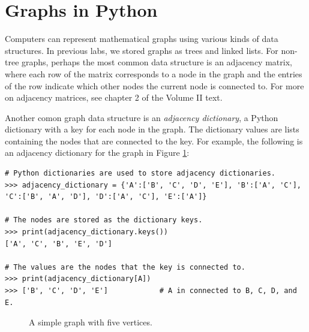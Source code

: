 \label{lab:SixDegreesKevinBacon}


\section*{Graphs in Python}

Computers can represent mathematical graphs using various kinds of data structures.
In previous labs, we stored graphs as trees and linked lists.
For non-tree graphs, perhaps the most common data structure is an adjacency matrix, where each row of the matrix corresponds to a node in the graph and the entries of the row indicate which other nodes the current node is connected to.
For more on adjacency matrices, see chapter 2 of the Volume II text.

Another comon graph data structure is an \emph{adjacency dictionary}, a Python dictionary with a key for each node in the graph.
The dictionary values are lists containing the nodes that are connected to the key.
For example, the following is an adjacency dictionary for the graph in Figure \ref{fig:simple_graph}:

\begin{lstlisting}
# Python dictionaries are used to store adjacency dictionaries.
>>> adjacency_dictionary = {'A':['B', 'C', 'D', 'E'], 'B':['A', 'C'],
'C':['B', 'A', 'D'], 'D':['A', 'C'], 'E':['A']}

# The nodes are stored as the dictionary keys.
>>> print(adjacency_dictionary.keys())
['A', 'C', 'B', 'E', 'D']

# The values are the nodes that the key is connected to.
>>> print(adjacency_dictionary[A])
>>> ['B', 'C', 'D', 'E']            # A in connected to B, C, D, and E.
\end{lstlisting}

\begin{figure}
\centering
{}
\caption{A simple graph with five vertices.}
\label{fig:simple_graph}
\end{figure}

